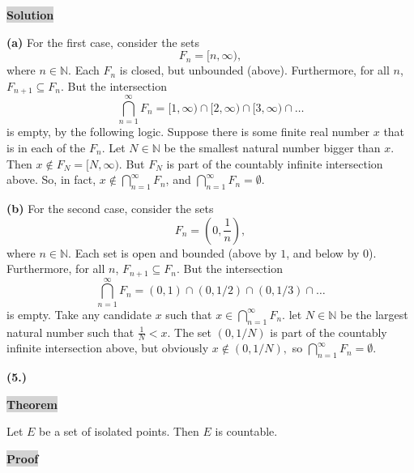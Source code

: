 \documentclass[12pt]{article}
\newcommand{\mybox}{%
    \collectbox{%
        \setlength{\fboxsep}{2pt}%
        \fbox{\BOXCONTENT}%
    }%
}
\begin{document}
\vspace{5mm}

\noindent\mybox{\colorbox{lightgray}{\textbf{Solution}}}\hspace{3mm}\hrulefill

\noindent \textbf{(a)} For the first case, consider the sets $$F_n = [n,\infty),$$ where $n\in\mathbb{N}.$ Each $F_n$ is closed, but unbounded (above). Furthermore, for all $n$, $F_{n+1}\subseteq F_n.$ But the intersection $$\bigcap\limits_{n=1}^{\infty} F_n = [1,\infty)\cap[2,\infty)\cap[3,\infty)\cap\ldots$$ is empty, by the following logic. Suppose there is some finite real number $x$ that is in each of the $F_n$. Let $N\in\mathbb{N}$ be the smallest natural number bigger than $x$. Then $x\not\in F_N = [N,\infty)$. But $F_N$ is part of the countably infinite intersection above. So, in fact, $x\not\in\bigcap\limits_{n=1}^{\infty}F_n$, and $\bigcap\limits_{n=1}^{\infty}F_n = \emptyset$.

\vspace{3mm}

\noindent \textbf{(b)} For the second case, consider the sets $$F_n = \left(0, \frac{1}{n}\right),$$ where $n\in\mathbb{N}.$ Each set is open and bounded (above by $1$, and below by $0$). Furthermore, for all $n$, $F_{n+1}\subseteq F_n$. But the intersection $$\bigcap\limits_{n=1}^{\infty} F_n = (0, 1)\cap(0,1/2)\cap(0, 1/3)\cap\ldots$$ is empty. Take any candidate $x$ such that $x\in\bigcap\limits_{n=1}^{\infty}F_n$. let $N\in\mathbb{N}$ be the largest natural number such that $\frac{1}{N} < x$. The set $(0,1/N)$ is part of the countably infinite intersection above, but obviously $x\not\in(0,1/N),$ so $\bigcap\limits_{n=1}^{\infty}F_n = \emptyset.$

\pagebreak

\noindent \textbf{(5.)}

\vspace{3mm}

\noindent\mybox{\colorbox{lightgray}{\textbf{Theorem}}}\hspace{3mm}\hrulefill

\noindent Let $E$ be a set of isolated points. Then $E$ is countable.

\vspace{5mm}

\noindent\mybox{\colorbox{lightgray}{\textbf{Proof}}}\hspace{3mm}\hrulefill
\end{document}
